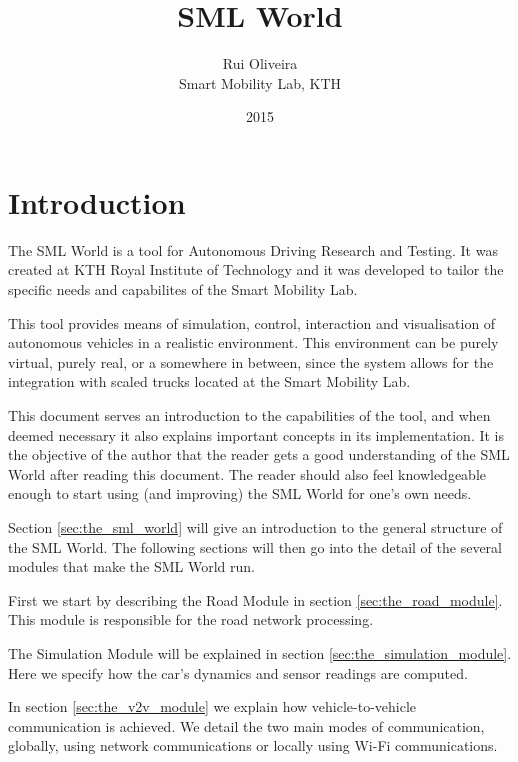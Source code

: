 \documentclass[10pt,a4paper]{article}
\begin{document}
\title{SML World}
\date{2015}
\author{Rui Oliveira\\ Smart Mobility Lab, KTH}

\maketitle

\tableofcontents

\newpage

\section{Introduction}

The SML World is a tool for Autonomous Driving Research and Testing. It was created at KTH Royal Institute of Technology and it was developed to tailor the specific needs and capabilites of the Smart Mobility Lab.

This tool provides means of simulation, control, interaction and visualisation of autonomous vehicles in a realistic environment. This environment can be purely virtual, purely real, or a somewhere in between, since the system allows for the integration with scaled trucks located at the Smart Mobility Lab.

This document serves an introduction to the capabilities of the tool, and when deemed necessary it also explains important concepts in its implementation. It is the objective of the author that the reader gets a good understanding of the SML World after reading this document. The reader should also feel knowledgeable enough to start using (and improving) the SML World for one's own needs.

Section \ref{sec:the_sml_world} will give an introduction to the general structure of the SML World. The following sections will then go into the detail of the several modules that make the SML World run.

First we start by describing the Road Module in section \ref{sec:the_road_module}. This module is responsible for the road network processing.

The Simulation Module will be explained in section \ref{sec:the_simulation_module}. Here we specify how the car's dynamics and sensor readings are computed.

In section \ref{sec:the_v2v_module} we explain how vehicle-to-vehicle communication is achieved. We detail the two main modes of communication, globally, using network communications or locally using Wi-Fi communications.
\end{document}
